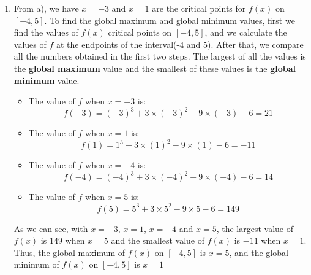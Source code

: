 \documentclass{article}
\begin{document}
\begin{enumerate}[label=({\alph*})]
        \item From a), we have \(x = -3\) and \(x = 1\) are the critical points for \(f(x)\) on \([-4, 5]\). To find the global maximum and global minimum values, first we find the values of \(f(x)\) critical points on \([-4, 5]\), and we calculate the values of \(f\) at the endpoints of the interval(-4 and 5). After that, we compare all the numbers obtained in the first two steps. The largest of all the values is the \textbf{global maximum} value and the smallest of these values is the \textbf{global minimum} value.
        \begin{itemize}
            \item The value of \(f\) when \(x = -3\) is:
            \[f(-3) = (-3)^{3} + 3 \times (-3)^{2} - 9 \times (-3) - 6 = 21\]
            \item The value of \(f\) when \(x = 1\) is:
            \[f(1) = 1^{3} + 3 \times (1)^{2} - 9 \times (1) - 6 = -11\]
            \item The value of \(f\) when \(x = -4\) is:
            \[f(-4) = (-4)^{3} + 3 \times (-4)^{2} - 9 \times (-4) - 6 = 14\]
            \item The value of \(f\) when \(x = 5\) is:
            \[f(5) = 5^{3} + 3 \times 5^{2} - 9 \times 5 - 6 = 149\]
        \end{itemize}
        As we can see, with \(x = -3\), \(x = 1\), \(x = -4\) and \(x = 5\), the largest value of \(f(x)\) is \(149\) when \(x = 5\) and the smallest value of \(f(x)\) is \(-11\) when \(x = 1\). Thus, the global maximum of \(f(x)\) on \([-4, 5]\) is \(x = 5\), and the global minimum of \(f(x)\) on \([-4, 5]\) is \(x = 1\)
        

\end{enumerate}
\end{document}
